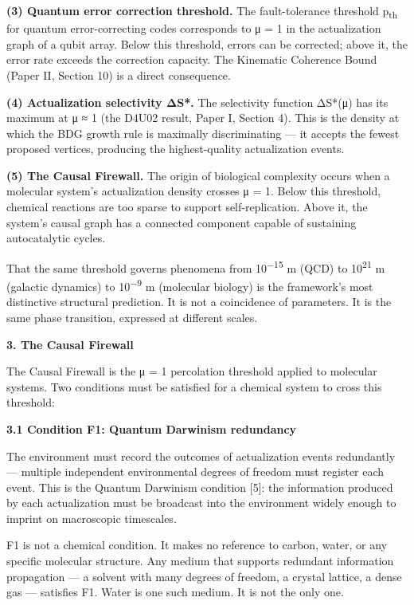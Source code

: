 \documentclass[12pt,a4paper]{article}
\begin{document}
\textbf{(3) Quantum error correction threshold.} The fault-tolerance
threshold p\textsubscript{th} for quantum error-correcting codes
corresponds to μ = 1 in the actualization graph of a qubit array. Below
this threshold, errors can be corrected; above it, the error rate
exceeds the correction capacity. The Kinematic Coherence Bound (Paper
II, Section 10) is a direct consequence.

\textbf{(4) Actualization selectivity ΔS*.} The selectivity function
ΔS*(μ) has its maximum at μ ≈ 1 (the D4U02 result, Paper I, Section 4).
This is the density at which the BDG growth rule is maximally
discriminating --- it accepts the fewest proposed vertices, producing
the highest-quality actualization events.

\textbf{(5) The Causal Firewall.} The origin of biological complexity
occurs when a molecular system's actualization density crosses μ = 1.
Below this threshold, chemical reactions are too sparse to support
self-replication. Above it, the system's causal graph has a connected
component capable of sustaining autocatalytic cycles.

That the same threshold governs phenomena from 10\textsuperscript{−15} m
(QCD) to 10\textsuperscript{21} m (galactic dynamics) to
10\textsuperscript{−9} m (molecular biology) is the framework's most
distinctive structural prediction. It is not a coincidence of
parameters. It is the same phase transition, expressed at different
scales.

\textbf{3. The Causal Firewall}

The Causal Firewall is the μ = 1 percolation threshold applied to
molecular systems. Two conditions must be satisfied for a chemical
system to cross this threshold:

\textbf{3.1 Condition F1: Quantum Darwinism redundancy}

The environment must record the outcomes of actualization events
redundantly --- multiple independent environmental degrees of freedom
must register each event. This is the Quantum Darwinism condition
{[}5{]}: the information produced by each actualization must be
broadcast into the environment widely enough to imprint on macroscopic
timescales.

F1 is not a chemical condition. It makes no reference to carbon, water,
or any specific molecular structure. Any medium that supports redundant
information propagation --- a solvent with many degrees of freedom, a
crystal lattice, a dense gas --- satisfies F1. Water is one such medium.
It is not the only one.
\end{document}
